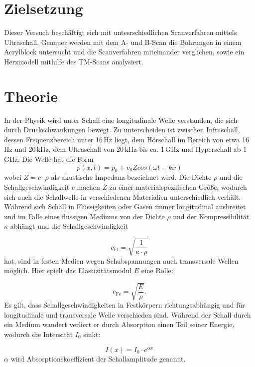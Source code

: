 \section{Zielsetzung}
Dieser Versuch beschäftigt sich mit untesrschiedlichen Scanverfahren mittels Ultraschall. Genauer werden mit dem A- und B-Scan die Bohrungen in einem Acrylblock untersucht und die Scanverfahren miteinander verglichen, sowie ein 
Herzmodell mithilfe des TM-Scans analysiert.



\section{Theorie}
In der Physik wird unter Schall eine longitudinale Welle verstanden, die sich durch Druckschwankungen bewegt. Zu unterscheiden ist zwischen Infraschall, dessen Frequenzbereich unter 16\,Hz liegt, dem Hörschall im Bereich von 
etwa 16\,Hz und 20\,kHz, dem Ultraschall von 20\,kHz bis ca. 1\,GHz und Hyperschall ab 1\,GHz.
Die Welle hat die Form
\begin{equation}
p(x,t) = p_0 + v_0 Z cos(\omega t - kx)
\end{equation}
wobei $Z = c\cdot \rho$ als akustische Impedanz bezeichnet wird. Die Dichte $\rho$ und die Schallgeschwindigkeit $c$ machen $Z$ zu einer materialspezifischen Größe, wodurch sich auch die Schallwelle in verschiedenen Materialien 
unterschiedlich verhält. Während sich Schall in Flüssigkeiten oder Gasen immer longitudinal ausbreitet und im Falle eines flüssigen Mediums von der Dichte $\rho$ und der Kompressibilität $\kappa$ abhängt und die Schallgeschwindigkeit

\begin{equation}
c_{\text{Fl}} = \sqrt{\frac{1}{\kappa \cdot \rho}}
\end{equation}
hat, sind in festen Medien wegen Schubspannungen auch transversale Wellen möglich. Hier spielt das Elastizitätsmodul $E$ eine Rolle:

\begin{equation}
c_{\text{Fe}} = \sqrt{\frac{E}{\rho}}.
\end{equation}
Es gilt, dass Schallgeschwindigkeiten in Festkörpern richtungsabhängig und für longitudinale und transversale Welle verschieden sind.
Während der Schall durch ein Medium wandert verliert er durch Absorption einen Teil seiner Energie, wodurch die Intensität $I_0$ sinkt:

\begin{equation}
I(x) = I_0\cdot e^{\alpha x}
\end{equation}
$\alpha$ wird Absorptionskoeffizient der Schallamplitude genannt. 

